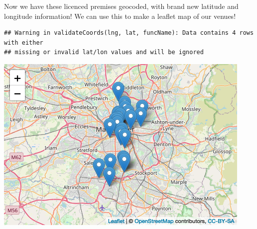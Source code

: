 \documentclass[
]{book}
\makeatletter
\newenvironment{Shaded}{\begin{snugshade}}{\end{snugshade}}
\newcommand{\AttributeTok}[1]{\textcolor[rgb]{0.61,0.61,0.61}{#1}}
\newcommand{\CommentTok}[1]{\textcolor[rgb]{0.37,0.37,0.37}{\textit{#1}}}
\newcommand{\FunctionTok}[1]{\textcolor[rgb]{0,0,0}{#1}}
\newcommand{\NormalTok}[1]{#1}
\newcommand{\OtherTok}[1]{\textcolor[rgb]{0.37,0.37,0.37}{#1}}
\newcommand{\SpecialCharTok}[1]{\textcolor[rgb]{0,0,0}{#1}}
\newenvironment{kframe}{%
\medskip{}
\setlength{\fboxsep}{.8em}
 \def\at@end@of@kframe{}%
 \ifinner\ifhmode%
  \def\at@end@of@kframe{\end{minipage}}%
  \begin{minipage}{\columnwidth}%
 \fi\fi%
 \def\FrameCommand##1{\hskip\@totalleftmargin \hskip-\fboxsep
 \colorbox{shadecolor}{##1}\hskip-\fboxsep
     \hskip-\linewidth \hskip-\@totalleftmargin \hskip\columnwidth}%
 \MakeFramed {\advance\hsize-\width
   \@totalleftmargin\z@ \linewidth\hsize
   \@setminipage}}%
 {\par\unskip\endMakeFramed%
 \at@end@of@kframe}
\renewenvironment{Shaded}{\begin{kframe}}{\end{kframe}}
\makeatother
\begin{document}
Now we have these licenced premises geocoded, with brand new latitude and longitude information! We can use this to make a leaflet map of our venues!

\begin{Shaded}
\end{Shaded}

\begin{verbatim}
## Warning in validateCoords(lng, lat, funcName): Data contains 4 rows with either
## missing or invalid lat/lon values and will be ignored
\end{verbatim}

\includegraphics{crime_mapping_files/figure-latex/unnamed-chunk-58-1.png}
\end{document}
